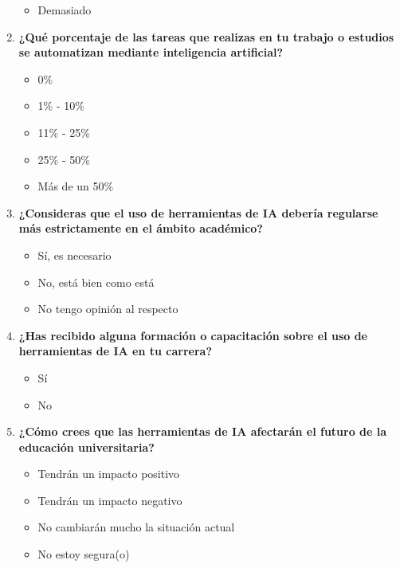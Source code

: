 \begin{multicols}{2}
\begin{enumerate}
\begin{itemize}
        \item Demasiado
      \end{itemize}
      \item \textbf{¿Qué porcentaje de las tareas que realizas en tu trabajo  o estudios se automatizan mediante inteligencia artificial?}
      \begin{itemize}
        \item 0\%
        \item 1\% - 10\%
        \item 11\% - 25\%
        \item 25\% - 50\%
        \item Más de un 50\%
      \end{itemize}
      \item \textbf{¿Consideras que el uso de herramientas de IA debería regularse más estrictamente en el ámbito académico?}
      \begin{itemize}
        \item Sí, es necesario
        \item No, está bien como está
        \item No tengo opinión al respecto
      \end{itemize}
      \item \textbf{¿Has recibido alguna formación o capacitación sobre el uso de herramientas de IA en tu carrera?}
      \begin{itemize}
        \item Sí
        \item No
      \end{itemize}
      \item \textbf{¿Cómo crees que las herramientas de IA afectarán el futuro de la educación universitaria?}
      \begin{itemize}
        \item Tendrán un impacto positivo
        \item Tendrán un impacto negativo
        \item No cambiarán mucho la situación actual
        \item No estoy segura(o)
      \end{itemize}
  \end{enumerate}
\end{multicols}